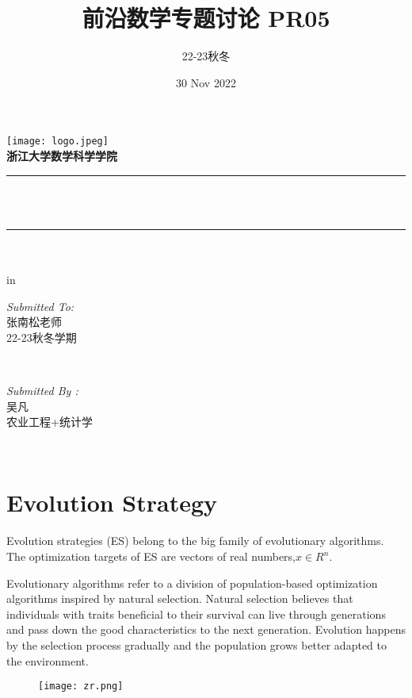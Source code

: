 \documentclass[12pt]{article}
\title{ 前沿数学专题讨论 PR05}								%
\author{22-23秋冬}								%
\date{30 Nov 2022}	%
\makeatletter
\let\thetitle\@title
\let\thedate\@date
\makeatother
\begin{document}

\begin{titlepage}
	\centering
    \vspace*{0.5 cm}
    \texttt{[image: logo.jpeg]}\\[1.0 cm]	%
	\textsc{\Large \textbf{浙江大学数学科学学院} }\\[0.5 cm]				%
	\rule{\linewidth}{0.2 mm} \\[0.4 cm]
	{ \huge \bfseries \thetitle}\\
	\rule{\linewidth}{0.2 mm} \\[1.5 cm]
	{  \bfseries \thedate}\\
	 in
	\begin{minipage}{0.4\textwidth}
		\begin{flushleft} \large
			\emph{Submitted To:}\\
			张南松老师\\
                22-23秋冬学期\\
			\end{flushleft}
			\end{minipage}~
			\begin{minipage}{0.4\textwidth}
            
			\begin{flushright} \large
			\emph{Submitted By :} \\
			吴凡\\
            农业工程+统计学\\
		\end{flushright}
        
	\end{minipage}\\[2 cm]		    
	
\end{titlepage}

\tableofcontents
\pagebreak




\section{Evolution Strategy}
Evolution strategies (ES) belong to the big family of evolutionary algorithms.
The optimization targets of ES are vectors of real numbers,$x \in R^n $.

Evolutionary algorithms refer to a division of population-based optimization algorithms inspired by natural selection. Natural selection believes that individuals with traits beneficial to their survival can live through generations and pass down the good characteristics to the next generation. Evolution happens by the selection process gradually and the population grows better adapted to the environment.
\begin{figure}[htbp]
	\centering
	\texttt{[image: zr.png]}
\end{figure}
\end{document}
